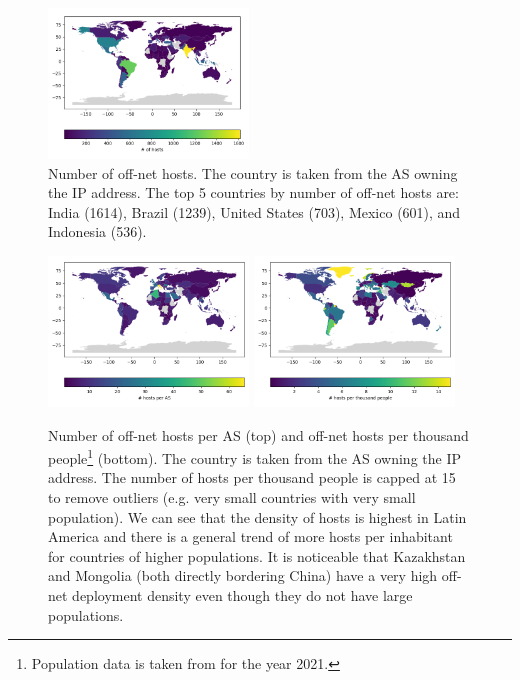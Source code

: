 \documentclass[sigconf,10pt,nonacm]{acmart}
\begin{document}
\begin{figure}[ht]
    \centering
    \includegraphics[width=0.475\textwidth]{graphics/hosts_per_country.png}
    \caption[Number of off-net hosts per country]{Number of off-net hosts. The country is taken from the AS owning the IP address. The top 5 countries by number of off-net hosts are: India (1614), Brazil (1239), United States (703), Mexico (601), and Indonesia (536).}
    \label{fig:hosts_per_country}
\end{figure}

\begin{figure}[ht]
    \centering
    \includegraphics[width=0.475\textwidth]{graphics/hosts_per_as_per_country.png}
    \includegraphics[width=0.475\textwidth]{graphics/hosts_per_thousand_per_country.png}
    \caption[Number of off-net hosts per country]{Number of off-net hosts per AS (top) and off-net hosts per thousand people\footnote{Population data is taken from \cite{united_nations_world_nodate} for the year 2021.} (bottom). The country is taken from the AS owning the IP address. The number of hosts per thousand people is capped at 15 to remove outliers (e.g. very small countries with very small population). We can see that the density of hosts is highest in Latin America and there is a general trend of more hosts per inhabitant for countries of higher populations. It is noticeable that Kazakhstan and Mongolia (both directly bordering China) have a very high off-net deployment density even though they do not have large populations.}
    \label{fig:hosts_per_country_more}
\end{figure}
\end{document}
